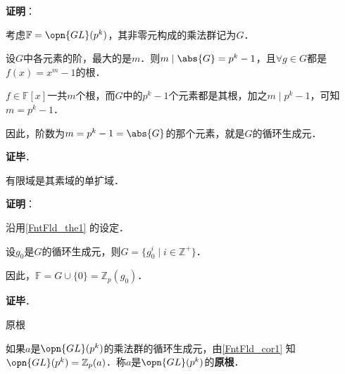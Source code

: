 \textbf{证明}：

考虑$\mathbb{F}=\opn{GL}(p^k)$，其非零元构成的乘法群记为$G$．

设$G$中各元素的阶，最大的是$m$．则$m\mid \abs{G} = p^k-1$，且$\forall g\in G$都是$f(x)=x^m-1$的根．

$f\in\mathbb{F}[x]$一共$m$个根，而$G$中的$p^k-1$个元素都是其根，加之$m\mid p^k-1$，可知$m=p^k-1$．

因此，阶数为$m=p^k-1=\abs{G}$的那个元素，就是$G$的循环生成元．

\textbf{证毕}．



\begin{corollary}{}\label{FntFld_cor1}
有限域是其素域的单扩域．
\end{corollary}

\textbf{证明}：

沿用\autoref{FntFld_the1} 的设定．

设$g_0$是$G$的循环生成元，则$G=\{g_0^i\mid i\in\mathbb{Z}^+\}$．

因此，$\mathbb{F}=G\cup\{0\}=\mathbb{Z}_p(g_0)$．

\textbf{证毕}．

\begin{definition}{原根}

如果$a$是$\opn{GL}(p^k)$的乘法群的循环生成元，由\autoref{FntFld_cor1} 知$\opn{GL}(p^k)=\mathbb{Z}_p(a)$．称$a$是$\opn{GL}(p^k)$的\textbf{原根}．

\end{definition}






























